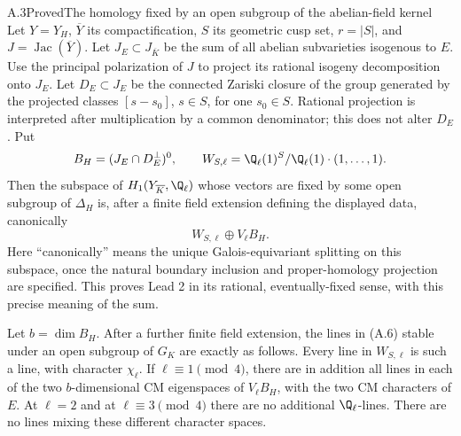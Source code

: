 \begin{statement}{A.3}{Proved}{The homology fixed by an open subgroup of the abelian-field kernel}
Let $Y=Y_H$, $\overline Y$ its compactification, $S$ its geometric cusp
set, $r=|S|$, and $J=\operatorname{Jac}(\overline Y)$. Let $J_E\subset
J_{\overline K}$ be the sum of all abelian subvarieties isogenous to $E$.
Use the principal polarization of $J$ to project its rational isogeny
decomposition onto $J_E$. Let $D_E\subset J_E$ be the connected
Zariski closure of the group generated by the projected classes
$[s-s_0]$, $s\in S$, for one $s_0\in S$. Rational projection is
interpreted after multiplication by a common denominator; this does not
alter $D_E$. Put
\[
 B_H=(J_E\cap D_E^\perp)^0,
 \qquad
 W_{S,\ell}=\Q_\ell(1)^S/\Q_\ell(1)\cdot(1,\ldots,1).
\]
Then the subspace of $H_1(Y_{\overline K},\Q_\ell)$ whose vectors
are fixed by some open subgroup of $\Delta_H$ is, after a finite field
extension defining the displayed data, canonically
\[
                    W_{S,\ell}\oplus V_\ell B_H.         \tag{A.6}
\]
Here ``canonically'' means the unique Galois-equivariant splitting on
this subspace, once the natural boundary inclusion and proper-homology
projection are specified. This proves Lead 2 in its rational,
eventually-fixed sense, with this precise meaning of the sum.

Let $b=\dim B_H$. After a further finite field extension, the lines in
(A.6) stable under an open subgroup of $G_K$ are exactly as follows.
Every line in $W_{S,\ell}$ is such a line, with character $\chi_\ell$.
If $\ell\equiv1\pmod4$, there are in addition all lines in each of
the two $b$-dimensional CM eigenspaces of $V_\ell B_H$, with the two
CM characters of $E$. At $\ell=2$ and at $\ell\equiv3\pmod4$ there
are no additional $\Q_\ell$-lines. There are no lines mixing these
different character spaces.
\end{statement}

